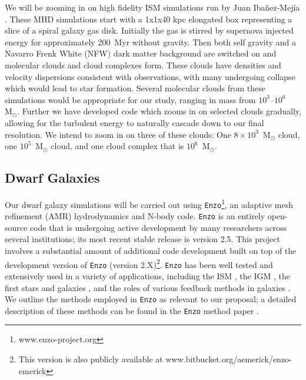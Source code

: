 \documentclass[11pt]{article}
\newcommand{\eg}{e.g.,}
\newcommand{\msun}{$\textrm{M}_{\odot}$}
\begin{document}
We will be zooming in on high fidelity ISM simulations run by Juan Iba\~{n}ez-Mej\'{i}a \citep{Ibanez-Mejia2016}. These MHD simulations start with a 1x1x40 kpc elongated box representing a slice of a spiral galaxy gas disk. Initially the gas is stirred by supernova injected energy for approximately 200~Myr without gravity. Then both self gravity and a Navarro Frenk White (NFW) dark matter background are switched on and molecular clouds and cloud complexes form. These clouds have densities and velocity dispersions consistent with observations, with many undergoing collapse which would lead to star formation. Several molecular clouds from these simulations would be appropriate for our study, ranging in mass from %
$10^3$--$10^6$~\msun.  Further we have developed code which zooms in on selected clouds gradually, allowing for the turbulent energy to naturally cascade down to our final resolution. We intend to zoom in on three of these clouds: One $8 \times 10^3$~{\msun} cloud, one $10^5$~{\msun} cloud, and one cloud complex that is $10^6$~{\msun}. %


\subsection{Dwarf Galaxies}
Our dwarf galaxy simulations will be carried out using \texttt{Enzo}\footnote{www.enzo-project.org}, an adaptive mesh refinement (AMR) hydrodynamics and N-body code. \texttt{Enzo} is an entirely open-source code that is undergoing active development by many researchers across several institutions; its most recent stable release is version 2.5. This project involves a substantial amount of additional code development built on top of the development version of \texttt{Enzo} (version 2.X)\footnote{This version is also publicly available at www.bitbucket.org/aemerick/enzo-emerick}. \texttt{Enzo} has been well tested and extensively used in a variety of applications, including the ISM \citep{2005MNRAS.356..737S, 2008ApJ...673..810T}, the IGM \citep{2000ApJ...534...57B, 2001ApJ...561L..31F}, the first stars and galaxies \citep[\eg][]{Wise2012a, WiseAbel2012, Wise2014}, and the roles of various feedback methods in galaxies \citep[\eg][]{Simpson2015, SalemBryan2014, Goldbaum2016, Forbes2016}. We outline the methods employed in \texttt{Enzo} as relevant to our proposal; a detailed description of these methods can be found in the \texttt{Enzo} method paper \citep{Enzo2014}. 
\end{document}
